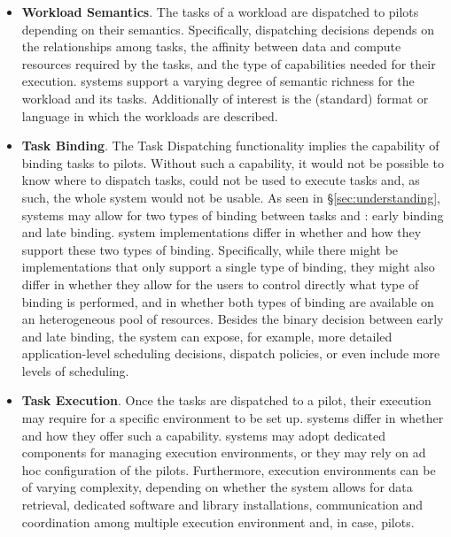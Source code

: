 \documentclass{sig-alternate}
\begin{document}
\begin{itemize}
\item \textbf{Workload Semantics}. The tasks of a workload are dispatched to
  pilots depending on their semantics. Specifically, dispatching decisions
  depends on the relationships among tasks, the affinity between data and
  compute resources required by the tasks, and the type of capabilities needed
  for their execution. \pilot systems support a varying degree of semantic
  richness for the workload and its tasks. Additionally of interest is the
  (standard) format or language in which the workloads are described.

\item \textbf{Task Binding}. The Task Dispatching functionality implies the
  capability of binding tasks to pilots. Without such a capability, it would
  not be possible to know where to dispatch tasks, \pilots could not be used to
  execute tasks and, as such, the whole \pilot system would not be usable. As
  seen in \S\ref{sec:understanding}, \pilot systems may allow for two types of
  binding between tasks and \pilots: early binding and late binding. \pilot
  system implementations differ in whether and how they support these two types
  of binding. Specifically, while there might be implementations that only
  support a single type of binding, they might also differ in whether they
  allow for the users to control directly what type of binding is performed,
  and in whether both types of binding are available on an heterogeneous pool
  of resources. Besides the binary decision between early and late binding, the
  \pilot system can expose, for example, more detailed application-level
  scheduling decisions, dispatch policies, or even include more levels of
  scheduling.


\item \textbf{Task Execution}. Once the tasks are dispatched to a pilot, their
  execution may require for a specific environment to be set up. \pilot systems
  differ in whether and how they offer such a capability. \pilot systems may
  adopt dedicated components for managing execution environments, or they may
  rely on ad hoc configuration of the pilots. Furthermore, execution
  environments can be of varying complexity, depending on whether the \pilot
  system allows for data retrieval, dedicated software and library
  installations, communication and coordination among multiple execution
  environment and, in case, pilots.


\end{itemize}
\end{document}
